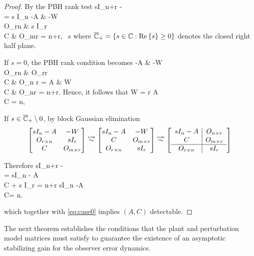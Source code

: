 \documentclass[preprint,review,11pt]{elsarticle}
\begin{document}
\begin{proof}
By the PBH rank test
\be
\rank \bM sI_{n+r} -  \\ \eM
=
\rank \bM s I_n -A & -W \\ O_{r\times n} & s I_r \\ C & O_{m\times r}  \eM = n+r, \forall ~s \in \cRHP \label{eq:PBH}
\ee
where ${\overline{{\mathbb{C}}}_{+}} = \{s \in {\mathbb{C}} : \mathrm{Re}\left\lbrace s\right\rbrace \geq 0\}$ denotes the closed right half plane. 

If $s =0$, the PBH rank condition becomes
\be
\rank \bM -A & -W \\ O_{r\times n} & O_{r\times r} \\ C &  O_{n \times r}\eM
=
\rank \bM A & W \\ C & O_{n\times r}  \eM 
= n+r.
\label{eq:s0}
\ee
Hence, it follows that 
\be
\rank W = r\quad {} \quad \rank \bM A \\ C \eM
= n,
\label{eq:case0}
\ee


If $s \in {\overline{{\mathbb{C}}}_{+}} \setminus 0$, by block Gaussian elimination
\begin{align}
\bM 
s I_n -A            &  -W \\ 
O_{r\times n} & s I_r \\ 
C                     & O_{m \times r}\eM
\req
\bM 
s I_n -A            & - W \\ 
C                     & O_{m \times r}\\
O_{r\times n} & s I_r 
\eM
\req
\left[\begin{array}{c|c}
s I_n -A            & O_{n\times r} \\ 
C                     & O_{m\times r} \\ \hline
O_{r\times n} & s I_r 
\end{array}\right]
\label{eq:sAbarCbar}
\end{align}

Therefore %
\be
\rank \bM sI_{n+r} -  \\ \eM
=
\rank \bM sI_{n} - A \\ C \eM + \rank s I_r 
= n+r 
\Rightarrow 
\rank \bM sI_{n} -A \\ C\eM = n. 
\label{eq:casenot0}
\ee

which together with \eqref{eq:case0} implies $(A,C)$ detectable.  
\end{proof}

The next theorem establishes the conditions that the plant and perturbation model matrices must satisfy to guarantee the existence of an asymptotic stabilizing gain for the observer error dynamics.
\end{document}
